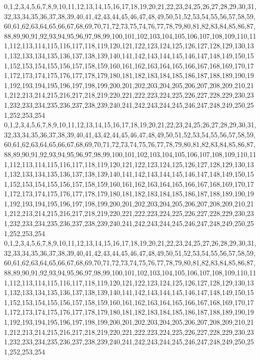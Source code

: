 \documentclass[12pt]{article}
\begin{document}
{0,1,2,3,4,5,6,7,8,9,10,11,12,13,14,15,16,17,18,19,20,21,22,23,24,25,26,27,28,29,30,31,32,33,34,35,36,37,38,39,40,41,42,43,44,45,46,47,48,49,50,51,52,53,54,55,56,57,58,59,60,61,62,63,64,65,66,67,68,69,70,71,72,73,75,74,76,77,78,79,80,81,82,83,84,85,86,87,88,89,90,91,92,93,94,95,96,97,98,99,100,101,102,103,104,105,106,107,108,109,110,111,112,113,114,115,116,117,118,119,120,121,122,123,124,125,126,127,128,129,130,131,132,133,134,135,136,137,138,139,140,141,142,143,144,145,146,147,148,149,150,151,152,153,154,155,156,157,158,159,160,161,162,163,164,165,166,167,168,169,170,171,172,173,174,175,176,177,178,179,180,181,182,183,184,185,186,187,188,189,190,191,192,193,194,195,196,197,198,199,200,201,202,203,204,205,206,207,208,209,210,211,212,213,214,215,216,217,218,219,220,221,222,223,224,225,226,227,228,229,230,231,232,233,234,235,236,237,238,239,240,241,242,243,244,245,246,247,248,249,250,251,252,253,254\\
0,1,2,3,4,5,6,7,8,9,10,11,12,13,14,15,16,17,18,19,20,21,22,23,24,25,26,27,28,29,30,31,32,33,34,35,36,37,38,39,40,41,43,42,44,45,46,47,48,49,50,51,52,53,54,55,56,57,58,59,60,61,62,63,64,65,66,67,68,69,70,71,72,73,74,75,76,77,78,79,80,81,82,83,84,85,86,87,88,89,90,91,92,93,94,95,96,97,98,99,100,101,102,103,104,105,106,107,108,109,110,111,112,113,114,115,116,117,118,119,120,121,122,123,124,125,126,127,128,129,130,131,132,133,134,135,136,137,138,139,140,141,142,143,144,145,146,147,148,149,150,151,152,153,154,155,156,157,158,159,160,161,162,163,164,165,166,167,168,169,170,171,172,173,174,175,176,177,178,179,180,181,182,183,184,185,186,187,188,189,190,191,192,193,194,195,196,197,198,199,200,201,202,203,204,205,206,207,208,209,210,211,212,213,214,215,216,217,218,219,220,221,222,223,224,225,226,227,228,229,230,231,232,233,234,235,236,237,238,239,240,241,242,243,244,245,246,247,248,249,250,251,252,253,254\\
0,1,2,3,4,5,6,7,8,9,10,11,12,13,14,15,16,17,18,19,20,21,22,23,24,25,27,26,28,29,30,31,32,33,34,35,36,37,38,39,40,41,42,43,44,45,46,47,48,49,50,51,52,53,54,55,56,57,58,59,60,61,62,63,64,65,66,67,68,69,70,71,72,73,74,75,76,77,78,79,80,81,82,83,84,85,86,87,88,89,90,91,92,93,94,95,96,97,98,99,100,101,102,103,104,105,106,107,108,109,110,111,112,113,114,115,116,117,118,119,120,121,122,123,124,125,126,127,128,129,130,131,132,133,134,135,136,137,138,139,140,141,142,143,144,145,146,147,148,149,150,151,152,153,154,155,156,157,158,159,160,161,162,163,164,165,166,167,168,169,170,171,172,173,174,175,176,177,178,179,180,181,182,183,184,185,186,187,188,189,190,191,192,193,194,195,196,197,198,199,200,201,202,203,204,205,206,207,208,209,210,211,212,213,214,215,216,217,218,219,220,221,222,223,224,225,226,227,228,229,230,231,232,233,234,235,236,237,238,239,240,241,242,243,244,245,246,247,248,249,250,251,252,253,254\\
}
\end{document}
